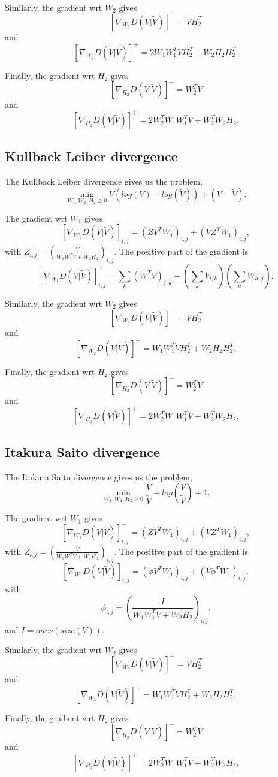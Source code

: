 \documentclass[journal]{IEEEtran}
\begin{document}
Similarly, the gradient wrt $W_2$ gives
$$ [\nabla_{W_2} D(V|\tilde{V})]^{-} = VH_2^T $$
and
$$ [\nabla_{W_2} D(V|\tilde{V})]^{+} = 2W_1W_1^TVH_2^T + W_2H_2H_2^T.$$

Finally, the gradient wrt $H_2$ gives
$$ [\nabla_{H_2} D(V|\tilde{V})]^{-} = W_2^TV  $$
and
$$ [\nabla_{H_2} D(V|\tilde{V})]^{+} = 2W_2^TW_1W_1^TV + W_2^TW_2H_2. $$


\subsection{Kullback Leiber divergence}\label{KLdisteq}
The Kullback Leiber divergence gives us the problem,
$$\min_{W_1,W_2,H_2 \geq 0} V(log(V) - log(\tilde{V})) + (V-\tilde{V}).$$

The gradient wrt $W_1$ gives
$$[\nabla_{W_1} D(V|\tilde{V})]_{i,j}^{-} = (ZV^TW_1)_{i,j} + (VZ^TW_1)_{i,j},$$
with $Z_{i,j} = (\frac{V}{W_1W_1^TV + W_2H_2})_{i,j}$. The positive part of the gradient is
$$[\nabla_{W_1} D(V|\tilde{V})]^{+}_{i,j} = \sum_k(W^TV)_{j,k} + (\sum_{k}V_{i,k})(\sum_a W_{a,j}).$$


Similarly, the gradient wrt $W_2$ gives
$$ [\nabla_{W_2} D(V|\tilde{V})]^{-} = VH_2^T $$
and
$$ [\nabla_{W_2} D(V|\tilde{V})]^{+} = W_1W_1^TVH_2^T + W_2H_2H_2^T.$$

Finally, the gradient wrt $H_2$ gives
$$ [\nabla_{H_2} D(V|\tilde{V})]^{-} = W_2^TV  $$
and
$$ [\nabla_{H_2} D(V|\tilde{V})]^{+} = 2W_2^TW_1W_1^TV + W_2^TW_2H_2. $$

 
\subsection{Itakura Saito divergence}\label{ISdisteq}
The Itakura Saito divergence gives us the problem,
$$\min_{W_1,W_2,H_2 \geq 0} \frac{V}{\tilde{V}} - log(\frac{V}{\tilde{V}}) +1.$$

The gradient wrt $W_1$ gives
$$[\nabla_{W_1} D(V|\tilde{V})]_{i,j}^{-} = (ZV^TW_1)_{i,j} + (VZ^TW_1)_{i,j},$$
with $Z_{i,j} = (\frac{V}{W_1W_1^TV + W_2H_2})_{i,j}$. 
The positive part of the gradient is
$$[\nabla_{W_1} D(V|\tilde{V})]_{i,j}^{-} = (\phi V^TW_1)_{i,j} + (V \phi^T W_1)_{i,j},$$
with $$ \phi_{i,j} = (\frac{I}{W_1W_1^TV + W_2H_2})_{i,j}.$$ and $I = ones(size(V))$.


Similarly, the gradient wrt $W_2$ gives
$$ [\nabla_{W_2} D(V|\tilde{V})]^{-} = VH_2^T $$
and
$$ [\nabla_{W_2} D(V|\tilde{V})]^{+} = W_1W_1^TVH_2^T + W_2H_2H_2^T.$$

Finally, the gradient wrt $H_2$ gives
$$ [\nabla_{H_2} D(V|\tilde{V})]^{-} = W_2^TV  $$
and
$$ [\nabla_{H_2} D(V|\tilde{V})]^{+} = 2W_2^TW_1W_1^TV + W_2^TW_2H_2. $$
\end{document}
